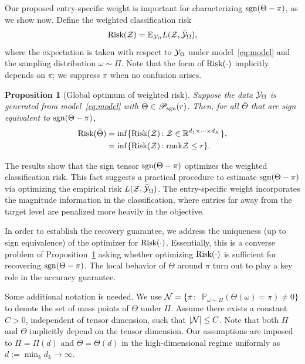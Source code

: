 \documentclass{article}
\theoremstyle{plain}
\newtheorem{prop}{Proposition}
\theoremstyle{definition}
\def\sign{\textup{sgn}}
\def\caliP{\mathscr{P}_{\textup{sgn}}}
\def\risk{\textup{Risk}}
\begin{document}
Our proposed entry-specific weight is important for characterizing $\sign(\Theta-\pi)$, as we show now. Define the weighted classification risk 
\begin{equation}\label{eq:population}
\textup{Risk}(\mathcal{Z})=\mathbb{E}_{\mathcal{Y}_\Omega}L(\mathcal{Z},\bar{\mathcal{Y}}_\Omega),
\end{equation}
where the expectation is taken with respect to $\mathcal{Y}_\Omega$ under model~\eqref{eq:model} and the sampling distribution $\omega\sim\Pi$. Note that the form of $\textup{Risk}(\cdot)$ implicitly depends on $\pi$; we suppress $\pi$ when no confusion arises. 
\begin{prop}[Global optimum of weighted risk]\label{prop:global}
Suppose the data $\mathcal{Y}_\Omega$ is generated from model~\eqref{eq:model} with $\Theta \in \caliP(r)$. Then, for all $\bar \Theta$ that are sign equivalent to $\sign(\Theta-\pi)$, 
\begin{align}\label{eq:optimal}
\textup{Risk}(\bar \Theta )&=\inf\{\textup{Risk}(\mathcal{Z})\colon \mathcal{Z}\in\mathbb{R}^{d_1\times \cdots \times d_K}\},\notag \\
&=\inf\{\textup{Risk}(\mathcal{Z})\colon \textup{rank} \mathcal{Z}\leq r\}.
\end{align}
\end{prop}
The results show that the sign tensor $\sign(\Theta-\pi)$ optimizes the weighted classification risk. This fact suggests a practical procedure to estimate $\sign(\Theta-\pi)$ via optimizing the empirical risk $L(\mathcal{Z},\bar {\mathcal{Y}}_\Omega)$. The entry-specific weight incorporates the magnitude information in the classification, where entries far away from the target level are penalized more heavily in the objective. 

In order to establish the recovery guarantee, we address the uniqueness (up to sign equivalence) of the optimizer for $\risk(\cdot)$. Essentially, this is a converse problem of Proposition~\ref{prop:global} asking whether optimizing $\risk(\cdot)$ is sufficient for recovering $\sign(\Theta-\pi)$. The local behavior of $\Theta$ around $\pi$ turn out to play a key role in the accuracy guarantee. 

Some additional notation is needed. %
We use $\mathcal{N}=\{\pi\colon$  $\mathbb{P}_{\omega\sim \Pi}(\Theta(\omega)=\pi)\neq 0\}$ to denote the set of mass points of $\Theta$ under $\Pi$. Assume there exists a constant $C>0$, independent of tensor dimension, such that $|\mathcal{N}|\leq C$. Note that both $\Pi$ and $\Theta$ implicitly depend on the tensor dimension. Our assumptions are imposed to $\Pi=\Pi(d)$ and $\Theta=\Theta(d)$ in the high-dimensional regime uniformly as $d:=\min_kd_k\to\infty$. 
\end{document}
